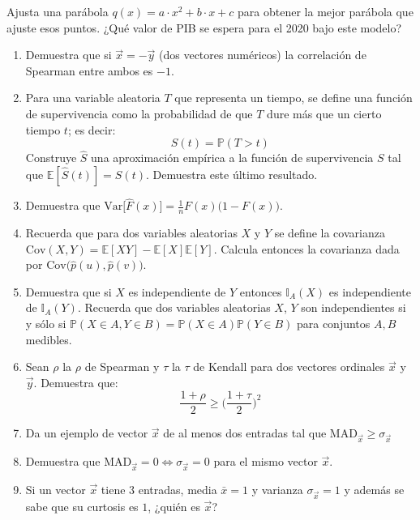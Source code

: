 \documentclass[
]{book}
\begin{document}
Ajusta una parábola \(q (x) = a \cdot x^2 + b\cdot x + c\) para obtener la mejor parábola que ajuste esos puntos. ¿Qué valor de PIB se espera para el 2020 bajo este modelo?

\begin{enumerate}
\def\labelenumi{\arabic{enumi}.}
\setcounter{enumi}{9}
\item
  Demuestra que si \(\vec{x} = -\vec{y}\) (dos vectores numéricos) la correlación de Spearman entre ambos es \(-1\).
\item
  Para una variable aleatoria \(T\) que representa un tiempo, se define una función de supervivencia como la probabilidad de que \(T\) dure más que un cierto tiempo \(t\); es decir:
  \begin{equation}\nonumber
  S(t) = \mathbb{P}(T > t)
  \end{equation}
  Construye \(\hat{S}\) una aproximación empírica a la función de supervivencia \(S\) tal que \(\mathbb{E}[\hat{S}(t)] = S(t)\). Demuestra este último resultado.
\item
  Demuestra que \(\text{Var}\big[ \hat{F}(x) \big] = \frac{1}{n} F(x) \big( 1 - F(x) \big)\).
\item
  Recuerda que para dos variables aleatorias \(X\) y \(Y\) se define la covarianza \(\text{Cov}(X,Y) = \mathbb{E}[XY] - \mathbb{E}[X]\mathbb{E}[Y]\). Calcula entonces la covarianza dada por \(\text{Cov}\big(\hat{p}(u), \hat{p}(v)\big)\).
\item
  Demuestra que si \(X\) es independiente de \(Y\) entonces \(\mathbb{I}_A(X)\) es independiente de \(\mathbb{I}_A(Y)\). Recuerda que dos variables aleatorias \(X\), \(Y\) son independientes si y sólo si \(\mathbb{P}(X \in A, Y \in B) = \mathbb{P}(X \in A) \mathbb{P}(Y \in B)\) para conjuntos \(A,B\) medibles.
\item
  Sean \(\rho\) la \(\rho\) de Spearman y \(\tau\) la \(\tau\) de Kendall para dos vectores ordinales \(\vec{x}\) y \(\vec{y}\). Demuestra que:
  \[
  \frac{1 + \rho}{2} \geq \Big( \frac{1 + \tau}{2} \Big)^2
  \]
\item
  Da un ejemplo de vector \(\vec{x}\) de al menos dos entradas tal que \(\text{MAD}_{\vec{x}} \geq \sigma_{\vec{x}}\)
\item
  Demuestra que \(\text{MAD}_{\vec{x}} = 0 \Leftrightarrow \sigma_{\vec{x}} = 0\) para el mismo vector \(\vec{x}\).
\item
  Si un vector \(\vec{x}\) tiene \(3\) entradas, media \(\bar{x} = 1\) y varianza \(\sigma_{\vec{x}} = 1\) y además se sabe que su curtosis es \(1\), ¿quién es \(\vec{x}\)?

\end{enumerate}
\end{document}
